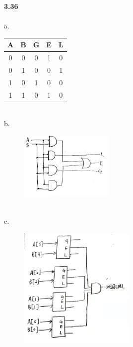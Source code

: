 \documentclass[a4paper,12pt]{article}     %
\begin{document}
\newpage
\textbf{3.36}\\
~\\
a. \
\begin{tabular}{c c|c c c}
  \hline
  A & B & G & E & L \\
  \hline
  0 & 0 & 0 & 1 & 0 \\
  0 & 1 & 0 & 0 & 1 \\
  1 & 0 & 1 & 0 & 0 \\
  1 & 1 & 0 & 1 & 0 \\
  \hline
\end{tabular}\\

b. \ \begin{figure}[h] \includegraphics[width = 0.4\textwidth]{../fig/3.36.b.jpeg} \end{figure}\\

c. \ \begin{figure}[h] \includegraphics[width = 0.5\textwidth]{../fig/3.36.c.jpeg} \end{figure}
\end{document}
